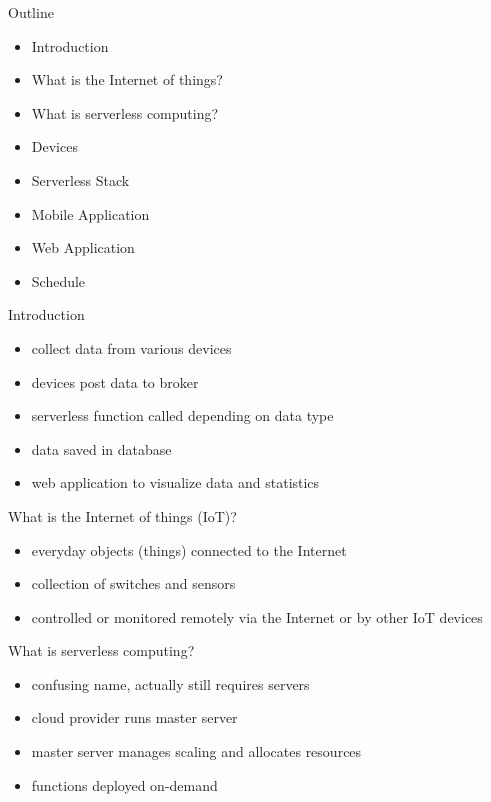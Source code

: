 \documentclass[aspectratio=1610]{beamer}
\begin{document}
  \maketitle

  \begin{frame}{Outline}
    \begin{itemize}
      \item Introduction
      \item What is the Internet of things?
      \item What is serverless computing?
      \item Devices
      \item Serverless Stack
      \item Mobile Application
      \item Web Application
      \item Schedule
    \end{itemize}
  \end{frame}

  \begin{frame}{Introduction}
    \begin{itemize}
      \item collect data from various devices
      \item devices post data to broker
      \item serverless function called depending on data type
      \item data saved in database
      \item web application to visualize data and statistics
    \end{itemize}
  \end{frame}

  \begin{frame}{What is the Internet of things (IoT)?}
    \begin{itemize}
      \item everyday objects (things) connected to the Internet
      \item collection of switches and sensors
      \item controlled or monitored remotely via the Internet or by other IoT devices
    \end{itemize}
  \end{frame}

  \begin{frame}{What is serverless computing?}
    \begin{itemize}
      \item confusing name, actually still requires servers
      \item cloud provider runs master server
      \item master server manages scaling and allocates resources
      \item functions deployed on-demand
    \end{itemize}
  \end{frame}
\end{document}
